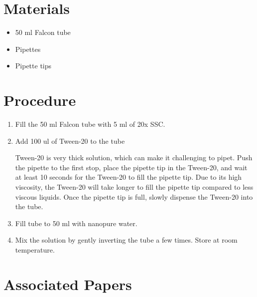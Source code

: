 \documentclass[
  letterpaper,
  DIV=11,
  numbers=noendperiod]{scrreprt}
\providecommand{\tightlist}{%
  \setlength{\itemsep}{0pt}\setlength{\parskip}{0pt}}\usepackage{longtable,booktabs,array}
\begin{document}
\hypertarget{materials-99}{%
\section{Materials}\label{materials-99}}

\begin{itemize}
\tightlist
\item
  50 ml Falcon tube
\item
  Pipettes
\item
  Pipette tips
\end{itemize}

\hypertarget{procedure-99}{%
\section{Procedure}\label{procedure-99}}

\begin{enumerate}
\def\labelenumi{\arabic{enumi}.}
\item
  Fill the 50 ml Falcon tube with 5 ml of 20x SSC.
\item
  Add 100 ul of Tween-20 to the tube

  \begin{tcolorbox}[enhanced jigsaw, toprule=.15mm, breakable, coltitle=black, leftrule=.75mm, title=\textcolor{quarto-callout-important-color}{\faExclamation}\hspace{0.5em}{NOTE}, bottomrule=.15mm, toptitle=1mm, bottomtitle=1mm, colframe=quarto-callout-important-color-frame, opacityback=0, colback=white, opacitybacktitle=0.6, colbacktitle=quarto-callout-important-color!10!white, rightrule=.15mm, titlerule=0mm, arc=.35mm, left=2mm]

  Tween-20 is very thick solution, which can make it challenging to
  pipet. Push the pipette to the first stop, place the pipette tip in
  the Tween-20, and wait at least 10 seconds for the Tween-20 to fill
  the pipette tip. Due to its high viscosity, the Tween-20 will take
  longer to fill the pipette tip compared to less viscous liquids. Once
  the pipette tip is full, slowly dispense the Tween-20 into the tube.

  \end{tcolorbox}
\item
  Fill tube to 50 ml with nanopure water.
\item
  Mix the solution by gently inverting the tube a few times. Store at
  room temperature.
\end{enumerate}

\hypertarget{associated-papers-73}{%
\section{Associated Papers}\label{associated-papers-73}}
\end{document}
